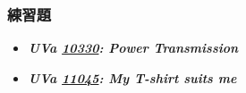 \subsubsection*{練習題}
\begin{itemize}[label={\Checkmark}]
\item \textbf{\textit{UVa \href{http://uva.onlinejudge.org/external/103/10330.html}{10330}: Power Transmission}}\\

\item \textbf{\textit{UVa \href{http://uva.onlinejudge.org/external/110/11045.html}{11045}: My T-shirt suits me}}\\

\end{itemize}